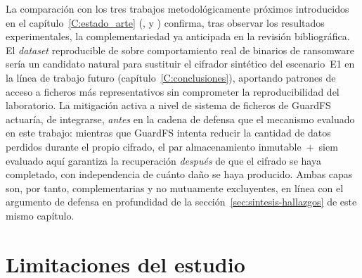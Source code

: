 \documentclass[../main.tex]{subfiles}
\begin{document}
La comparación con los tres trabajos metodológicamente próximos introducidos en
el capítulo~\ref{C:estado_arte} (\textcite{gehani2023}, \textcite{vonderassen2024}
y \textcite{netsecbed2026}) confirma, tras observar los resultados
experimentales, la complementariedad ya anticipada en la revisión bibliográfica.
El \emph{dataset} reproducible de \textcite{gehani2023} sobre comportamiento
real de binarios de ransomware sería un candidato natural para sustituir el
cifrador sintético del escenario~E1 en la línea de trabajo futuro
(capítulo~\ref{C:conclusiones}), aportando patrones de acceso a ficheros más
representativos sin comprometer la reproducibilidad del laboratorio. La
mitigación activa a nivel de sistema de ficheros de GuardFS~\cite{vonderassen2024}
actuaría, de integrarse, \emph{antes} en la cadena de defensa que el mecanismo
evaluado en este trabajo: mientras que GuardFS intenta reducir la cantidad de
datos perdidos durante el propio cifrado, el par almacenamiento
inmutable~+~\gls{siem} evaluado aquí garantiza la recuperación \emph{después}
de que el cifrado se haya completado, con independencia de cuánto daño se haya
producido. Ambas capas son, por tanto, complementarias y no mutuamente
excluyentes, en línea con el argumento de defensa en profundidad de la
sección~\ref{sec:sintesis-hallazgos} de este mismo capítulo.

\section{Limitaciones del estudio}
\label{sec:limitaciones-estudio}
\end{document}
